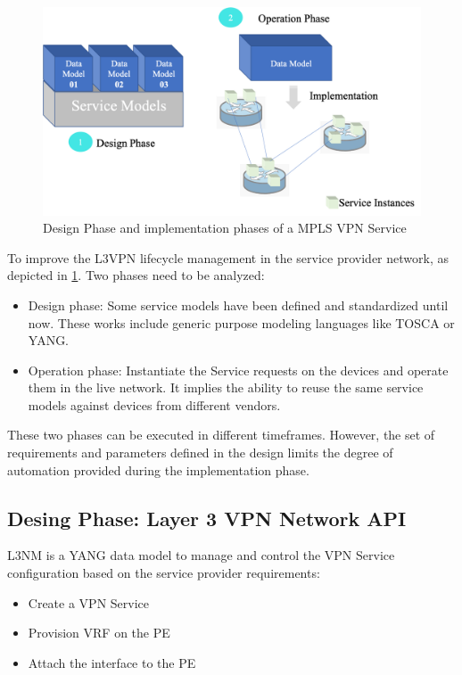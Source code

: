 \documentclass[conference]{IEEEtran}
\begin{document}
\begin{figure}
	\centering
		\includegraphics[scale=0.3]{figure2png.png}
	\caption{Design Phase and implementation phases of a MPLS VPN Service}
	\label{FIG:2}
\end{figure}

To improve the L3VPN lifecycle management in the service provider network, as depicted in \cref{FIG:2}. Two phases need to be analyzed:
\begin{itemize}
    \item Design phase: Some service models have been defined and standardized until now. These works include generic purpose modeling languages like TOSCA or YANG.
    \item Operation phase: Instantiate the Service requests on the devices and operate them in the live network. It implies the ability to reuse the same service models against devices from different vendors.
\end{itemize}

These two phases can be executed in different timeframes. However, the set of requirements and parameters defined in the design limits the degree of automation provided during the implementation phase. 

\subsection{Desing Phase: Layer 3 VPN Network API}

L3NM \cite{Aguado:2019aa} is a YANG data model to manage and control the VPN Service configuration based on the service provider requirements:
\begin{itemize}
    \item Create a VPN Service
    \item Provision VRF on the PE
    \item  Attach the interface to the PE
\end{itemize}
\end{document}
